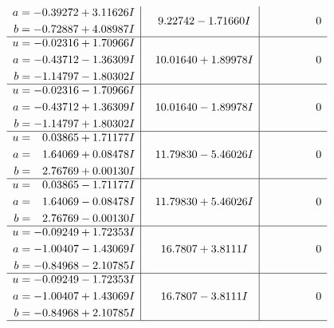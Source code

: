 \documentclass[1p]{elsarticle_modified}
\theoremstyle{definition}
\begin{document}
$$\begin{array}{c|c|c}
\begin{aligned}
a &= -0.39272 + 3.11626 I \\
b &= -0.72887 + 4.08987 I\end{aligned}
 & \phantom{-}9.22742 - 1.71660 I & \phantom{-0.000000 } 0 \\ \hline\begin{aligned}
u &= -0.02316 + 1.70966 I \\
a &= -0.43712 - 1.36309 I \\
b &= -1.14797 - 1.80302 I\end{aligned}
 & \phantom{-}10.01640 + 1.89978 I & \phantom{-0.000000 } 0 \\ \hline\begin{aligned}
u &= -0.02316 - 1.70966 I \\
a &= -0.43712 + 1.36309 I \\
b &= -1.14797 + 1.80302 I\end{aligned}
 & \phantom{-}10.01640 - 1.89978 I & \phantom{-0.000000 } 0 \\ \hline\begin{aligned}
u &= \phantom{-}0.03865 + 1.71177 I \\
a &= \phantom{-}1.64069 + 0.08478 I \\
b &= \phantom{-}2.76769 + 0.00130 I\end{aligned}
 & \phantom{-}11.79830 - 5.46026 I & \phantom{-0.000000 } 0 \\ \hline\begin{aligned}
u &= \phantom{-}0.03865 - 1.71177 I \\
a &= \phantom{-}1.64069 - 0.08478 I \\
b &= \phantom{-}2.76769 - 0.00130 I\end{aligned}
 & \phantom{-}11.79830 + 5.46026 I & \phantom{-0.000000 } 0 \\ \hline\begin{aligned}
u &= -0.09249 + 1.72353 I \\
a &= -1.00407 - 1.43069 I \\
b &= -0.84968 - 2.10785 I\end{aligned}
 & \phantom{-}16.7807 + 3.8111 I & \phantom{-0.000000 } 0 \\ \hline\begin{aligned}
u &= -0.09249 - 1.72353 I \\
a &= -1.00407 + 1.43069 I \\
b &= -0.84968 + 2.10785 I\end{aligned}
 & \phantom{-}16.7807 - 3.8111 I & \phantom{-0.000000 } 0\\
 \hline 

\end{array}$$
\end{document}
